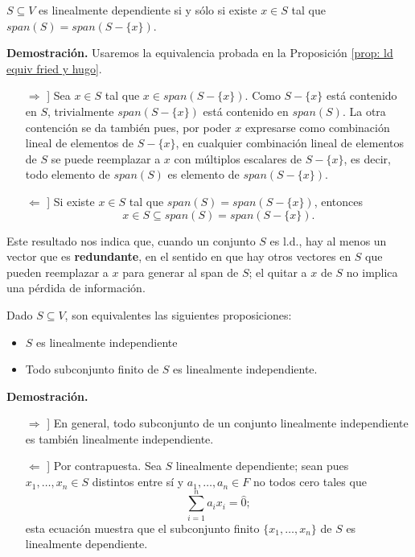 \begin{prop}
$S \subseteq V$ es linealmente dependiente si y sólo si 
existe $x \in S$ tal que $span(S) = 
span(S - \{ x \})$.
\end{prop}
\noindent
\textbf{Demostración.}
Usaremos la equivalencia probada en la Proposición
\ref{prop: ld equiv fried y hugo}.
\begin{itemize}
	\item[$\Rightarrow$]] Sea $x \in S$ tal que 
	$x \in span(S - \{ x \})$.
	 Como $S - \{ x \}$ está contenido 
	en $S$, trivialmente $span(S - \{ x \})$
	está contenido en $span(S)$. 
	La otra contención se 
	da también pues, por poder $x$ expresarse como combinación lineal 
	de elementos de $S - \{ x \}$, en cualquier combinación lineal
	de elementos de $S$ se puede reemplazar a $x$ con múltiplos
	escalares de $S-\{ x \}$, es decir, todo elemento
	de $span(S)$ es elemento de 
	$span(S - \{ x \})$.
	\item[$\Leftarrow$]]  Si existe $x \in S$
	tal que $span(S) = 
	span(S - \{ x \})$, entonces
	\[
	x \in S \subseteq span(S) = 
	span(S - \{ x \}).
	\]
	
\end{itemize}

\QEDB
\vspace{0.2cm}

Este resultado nos indica que, cuando un conjunto $S$
es l.d., hay al menos un vector 
que es \textbf{redundante}, en el sentido en que hay otros
vectores en $S$ que pueden reemplazar a $x$ para generar
al span de $S$; el quitar a $x$ de $S$ no implica una pérdida
de información.

\begin{prop}
	\label{prop: li caracter finito}
Dado $S \subseteq V$, son equivalentes las siguientes proposiciones:
\begin{itemize}
	\item $S$ es linealmente independiente
	\item Todo subconjunto finito de $S$ es linealmente independiente.
\end{itemize}
\end{prop}
\noindent
\textbf{Demostración.}

\begin{itemize}
	\item[$\Rightarrow$]] En general, todo subconjunto de un
	conjunto linealmente independiente es también linealmente
	independiente.
	\item[$\Leftarrow$]] Por contrapuesta. Sea
	$S$ linealmente dependiente; sean pues $x_{1}, \ldots , x_{n} \in S$
	distintos entre sí y $a_{1}, \ldots , a_{n} \in F$ no todos cero 
	tales que 
	\[
	\sum_{i=1}^{n} a_{i}x_{i} = \hat{0};
	\] 
	esta ecuación muestra que el subconjunto finito
	$\{ x_{1}, \ldots , x_{n} \}$ de $S$ es linealmente dependiente.
\end{itemize}

